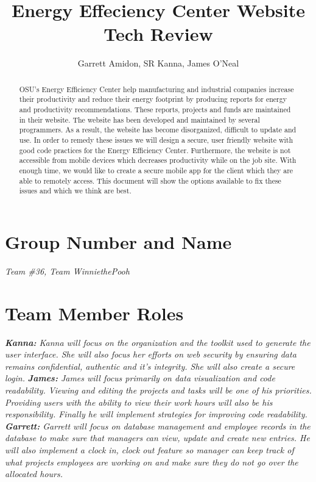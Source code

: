 \documentclass[letterpaper,10pt,titlepage,journal,compsoc,draftclsnofoot,onecolumn]{IEEEtran}
\title{Energy Effeciency Center Website \\
	\large Tech Review}
\author{Garrett Amidon, SR Kanna, James O'Neal}
\newcommand\tab[1][1cm]{\hspace*{#1}}
\begin{document}
\begin{titlingpage}
    \maketitle
	\centering{}
    \begin{abstract}
        
        OSU’s Energy Efficiency Center help manufacturing and industrial companies increase their productivity and reduce their energy footprint by producing reports for energy and productivity recommendations. These reports, projects and funds are maintained in their website. The website has been developed and maintained by several programmers. As a result, the website has become disorganized, difficult to update and use. In order to remedy these issues we will design a secure, user friendly website with good code practices for the Energy Efficiency Center. 	Furthermore, the website is not accessible from mobile devices which decreases productivity while on the job site. With enough time, we would like to create a secure mobile app for the client which they are able to remotely access. This document will show the options available to fix these issues and which we think are best. 
        
    \end{abstract}
\end{titlingpage}

\newpage

\tableofcontents{}

\newpage


\section{Group Number and Name}
\textit{Team \#36, Team WinniethePooh}

\section{Team Member Roles}

\tab\textit{\textbf{Kanna:} Kanna will focus on the organization and the toolkit used to generate the user interface. She will also focus her efforts on web security by ensuring data remains confidential, authentic and it’s integrity. She will also create a secure login.} \newline
\tab\textit{\textbf{James:} James will focus primarily on data visualization and code readability. Viewing and editing the projects and tasks will be one of his priorities. Providing users with the ability to view their work hours will also be his responsibility. Finally he will implement strategies for improving code readability.} \newline
\tab\textit{\textbf{Garrett:} Garrett will focus on database management and employee records in the database to make sure that managers can view, update and create new entries. He will also implement a clock in, clock out feature so manager can keep track of what projects employees are working on and make sure they do not go over the allocated hours.} 
\end{document}
